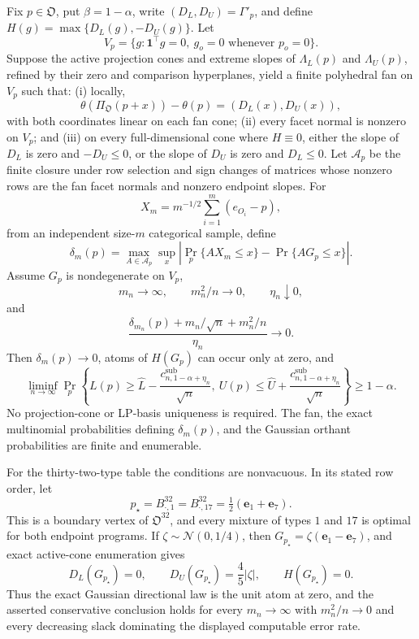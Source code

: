 Fix \(p\in\mathfrak O\), put \(\beta=1-\alpha\), write \((D_L,D_U)=\Gamma'_p\), and define \(H(g)=\max\{D_L(g),-D_U(g)\}\).  Let
\[
V_p=\{g:\mathbf 1^{\top}g=0,\ g_o=0\text{ whenever }p_o=0\}.
\]
Suppose the active projection cones and extreme slopes of \(\Lambda_L(p)\) and \(\Lambda_U(p)\), refined by their zero and comparison hyperplanes, yield a finite polyhedral fan on \(V_p\) such that: (i) locally,
\[
\theta(\Pi_{\mathfrak O}(p+x))-\theta(p)=(D_L(x),D_U(x)),
\]
with both coordinates linear on each fan cone; (ii) every facet normal is nonzero on \(V_p\); and (iii) on every full-dimensional cone where \(H\equiv0\), either the slope of \(D_L\) is zero and \(-D_U\leq0\), or the slope of \(D_U\) is zero and \(D_L\leq0\).  Let \(\mathcal A_p\) be the finite closure under row selection and sign changes of matrices whose nonzero rows are the fan facet normals and nonzero endpoint slopes.  For
\[
X_m=m^{-1/2}\sum_{i=1}^m(e_{O_i}-p),
\]
from an independent size-\(m\) categorical sample, define
\[
\delta_m(p)=\max_{A\in\mathcal A_p}\sup_x
\left|\Pr_p\{AX_m\leq x\}-\Pr\{AG_p\leq x\}\right|.
\]
Assume \(G_p\) is nondegenerate on \(V_p\),
\[
m_n\to\infty,\qquad m_n^2/n\to0,\qquad\eta_n\downarrow0,
\]
and
\[
\frac{\delta_{m_n}(p)+m_n/\sqrt n+m_n^2/n}{\eta_n}\to0.
\]
Then \(\delta_m(p)\to0\), atoms of \(H(G_p)\) can occur only at zero, and
\[
\liminf_{n\to\infty}\Pr_p\left\{
L(p)\geq\widehat L-\frac{c^{\mathrm{sub}}_{n,1-\alpha+\eta_n}}{\sqrt n},\
U(p)\leq\widehat U+\frac{c^{\mathrm{sub}}_{n,1-\alpha+\eta_n}}{\sqrt n}
\right\}\geq1-\alpha.
\]
No projection-cone or LP-basis uniqueness is required.  The fan, the exact multinomial probabilities defining \(\delta_m(p)\), and the Gaussian orthant probabilities are finite and enumerable.

For the thirty-two-type table the conditions are nonvacuous.  In its stated row order, let
\[
p_\star=B^{32}_{\cdot,1}=B^{32}_{\cdot,17}
=\tfrac12(\mathbf e_1+\mathbf e_7).
\]
This is a boundary vertex of \(\mathfrak O^{32}\), and every mixture of types \(1\) and \(17\) is optimal for both endpoint programs.  If \(\zeta\sim\mathcal N(0,1/4)\), then \(G_{p_\star}=\zeta(\mathbf e_1-\mathbf e_7)\), and exact active-cone enumeration gives
\[
D_L(G_{p_\star})=0,\qquad
D_U(G_{p_\star})=\frac45|\zeta|,\qquad
H(G_{p_\star})=0.
\]
Thus the exact Gaussian directional law is the unit atom at zero, and the asserted conservative conclusion holds for every \(m_n\to\infty\) with \(m_n^2/n\to0\) and every decreasing slack dominating the displayed computable error rate.